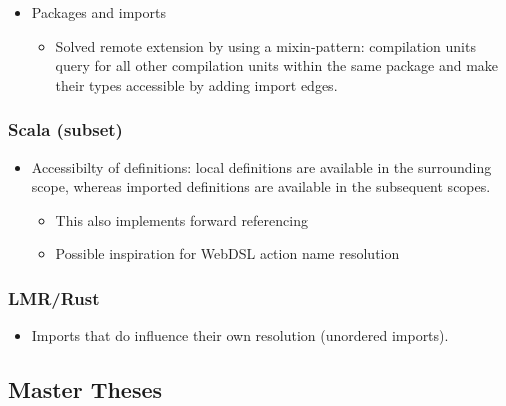         \begin{itemize}
          \item Packages and imports
          \begin{itemize}
            \item Solved remote extension by using a mixin-pattern: compilation units query for all other compilation units within the same package and make their types accessible by adding import edges.
          \end{itemize}
        \end{itemize}

      \subsubsection{Scala (subset)}

        \begin{itemize}
          \item Accessibilty of definitions: local definitions are available in the surrounding scope, whereas imported definitions are available in the subsequent scopes.
          \begin{itemize}
            \item This also implements forward referencing
            \item Possible inspiration for WebDSL action name resolution
          \end{itemize}
        \end{itemize}

      \subsubsection{LMR/Rust}

        \begin{itemize}
          \item Imports that do influence their own resolution (unordered imports).
        \end{itemize}

    \subsection{Master Theses}


